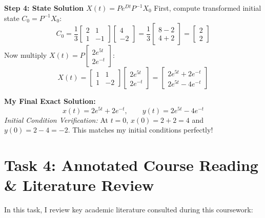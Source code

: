 \documentclass[12pt,a4paper]{article}
\theoremstyle{definition}
\theoremstyle{plain}
\begin{document}
\textbf{Step 4: State Solution $X(t) = P e^{Dt} P^{-1} X_0$}
First, compute transformed initial state $C_0 = P^{-1} X_0$:
\[
C_0 = \frac{1}{3} \begin{bmatrix} 2 & 1 \\ 1 & -1 \end{bmatrix} \begin{bmatrix} 4 \\ -2 \end{bmatrix} = \frac{1}{3} \begin{bmatrix} 8 - 2 \\ 4 + 2 \end{bmatrix} = \begin{bmatrix} 2 \\ 2 \end{bmatrix}
\]
Now multiply $X(t) = P \begin{bmatrix} 2 e^{5t} \\ 2 e^{-t} \end{bmatrix}$:
\[
X(t) = \begin{bmatrix} 1 & 1 \\ 1 & -2 \end{bmatrix} \begin{bmatrix} 2 e^{5t} \\ 2 e^{-t} \end{bmatrix} = \begin{bmatrix} 2 e^{5t} + 2 e^{-t} \\[0.4em] 2 e^{5t} - 4 e^{-t} \end{bmatrix}
\]

\textbf{My Final Exact Solution:}
\[
x(t) = 2 e^{5t} + 2 e^{-t}, \qquad y(t) = 2 e^{5t} - 4 e^{-t}
\]
\textit{Initial Condition Verification:} At $t=0$, $x(0) = 2+2 = 4$ and $y(0) = 2-4 = -2$. This matches my initial conditions perfectly!

\newpage
\section{Task 4: Annotated Course Reading & Literature Review}

In this task, I review key academic literature consulted during this coursework:
\end{document}
